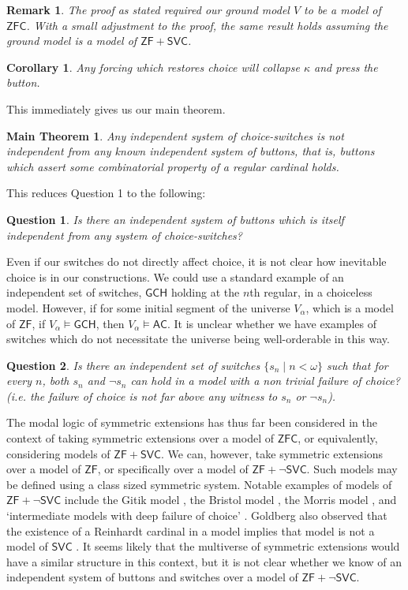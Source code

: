 \documentclass[a4paper,11pt]{amsart}
\newtheorem{cor}[theorem]{Corollary}
\newtheorem{question}{Question}
\newtheorem{remark}[theorem]{Remark}
\newtheorem*{main}{Main Theorem}
\theoremstyle{definition}
\newcommand{\AC}{\mathsf{AC}}
\newcommand{\ZF}{\mathsf{ZF}}
\newcommand{\ZFC}{\mathsf{ZFC}}
\newcommand{\SVC}{\mathsf{SVC}}
\newcommand{\GCH}{\mathsf{GCH}}
\begin{document}
\begin{remark}
    The proof as stated required our ground model $V$ to be a model of $\ZFC$. With a small adjustment to the proof, the same result holds assuming the ground model is a model of $\ZF + \SVC$.
\end{remark}

\begin{cor}
    Any forcing which restores choice will collapse $\kappa$ and press the button.
\end{cor}


This immediately gives us our main theorem. 

\begin{main}
    Any independent system of choice-switches is not independent from any known independent system of buttons, that is, buttons which assert some combinatorial property of a regular cardinal holds. 
\end{main}

This reduces Question 1 to the following: 

\begin{question}
    Is there an independent system of buttons which is itself independent from any system of choice-switches? 
\end{question}

Even if our switches do not directly affect choice, it is not clear how inevitable choice is in our constructions. We could use a standard example of an independent set of switches, $\GCH$ holding at the $n$th regular, in a choiceless model. However, if for some initial segment of the universe $V_\alpha$, which is a model of $\ZF$, if $V_\alpha \models \GCH$, then $V_\alpha \models \AC$. It is unclear whether we have examples of switches which do not necessitate the universe being well-orderable in this way.  

\begin{question}
    Is there an independent set of switches $\{s_n \mid n < \omega\}$ such that for every $n$, both $s_n$ and $\neg s_n$ can hold in a model with a non trivial failure of choice? (i.e. the failure of choice is not far above any witness to $s_n$ or $\neg s_n$).
\end{question}

The modal logic of symmetric extensions has thus far been considered in the context of taking symmetric extensions over a model of $\ZFC$, or equivalently, considering models of $\ZF + \SVC$. We can, however, take symmetric extensions over a model of $\ZF$, or specifically over a model of $\ZF + \neg\SVC$. Such models may be defined using a class sized symmetric system. Notable examples of models of $\ZF + \neg \SVC$ include the Gitik model \cite{Gitik}, the Bristol model \cite{karagila-bristol}, the Morris model \cite{karagila-morris}, and `intermediate models with deep failure of choice' \cite{hayut2024intermediatemodelsdeepfailure}. Goldberg also observed that the existence of a Reinhardt cardinal in a model implies that model is not a model of $\SVC$ \cite{Goldberg-Overflow}. It seems likely that the multiverse of symmetric extensions would have a similar structure in this context, but it is not clear whether we know of an independent system of buttons and switches over a model of $\ZF + \neg\SVC$.
\end{document}
